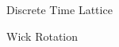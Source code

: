\documentclass{beamer}
\begin{document}
\begin{frame}{Discrete Time Lattice}
{{\begin{block}{Wick Rotation}
            \end{block}
        }
        }
        
    \end{frame}
\end{document}
